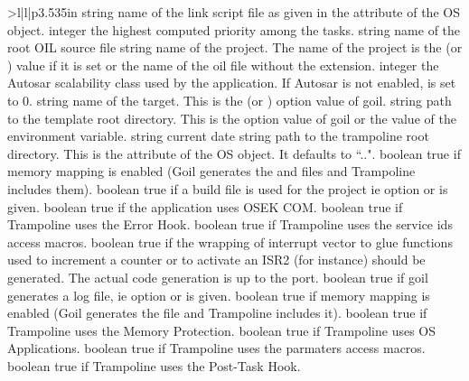 \begin{sortedtable}{>{\va}l|l|p{3.535in}}
{string}
{name of the link script file as given in the  attribute of the OS object.} 
{integer}
{the highest computed priority among the tasks.} 
{string}
{name of the root OIL source file} 
{string}
{name of the project. The name of the project is the  (or ) value if it is set or the name of the oil file without the extension.} 
{integer}
{the Autosar scalability class used by the application. If Autosar is not enabled,  is set to 0.} 
{string}
{name of the target. This is the  (or ) option value of goil.} 
{string}
{path to the template root directory. This is the  option value of goil or the value of the  environment variable.} 
{string}
{current date} 
{string}
{path to the trampoline root directory. This is the  attribute of the OS object. It defaults to ``..".} 
{boolean}
{true if memory mapping is enabled (Goil generates the  and  files and Trampoline includes them).} 
{boolean}
{true if a build file is used for the project ie option  or  is given.} 
{boolean}
{true if the application uses OSEK COM.} 
{boolean}
{true if Trampoline uses the Error Hook.} 
{boolean}
{true if Trampoline uses the service ids access macros.} 
{boolean}
{true if the wrapping of interrupt vector to glue functions used to increment a counter or to activate an ISR2 (for instance) should be generated. The actual code generation is up to the port.} 
{boolean}
{true if goil generates a log file, ie option  or  is given.}
{boolean}
{true if memory mapping is enabled (Goil generates the  file and Trampoline includes it).} 
{boolean}
{true if Trampoline uses the Memory Protection.} 
{boolean}
{true if Trampoline uses OS Applications.} 
{boolean}
{true if Trampoline uses the parmaters access macros.} 
{boolean}
{true if Trampoline uses the Post-Task Hook.} 

\end{sortedtable}
